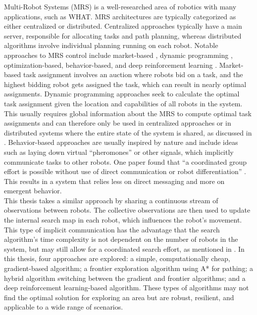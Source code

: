 Multi-Robot Systems (MRS) is a well-researched area of robotics with many applications, such as {\color{red} WHAT}. 
MRS architectures are typically categorized as either centralized or distributed. 
Centralized approaches typically have a main server, responsible for allocating tasks and path planning, whereas distributed algorithms involve individual planning running on each robot.
Notable approaches to MRS control include market-based \cite{trigui2014market}, dynamic programming \cite{kato2011dp}, optimization-based, behavior-based, and deep reinforcement learning \cite{huttenrauch2019deep-swarm}.
Market-based task assignment involves an auction where robots bid on a task, and the highest bidding robot gets assigned the task, which can result in nearly optimal assignments.
Dynamic programming approaches seek to calculate the optimal task assignment given the location and capabilities of all robots in the system.
This usually requires global information about the MRS to compute optimal task assignments and can therefore only be used in centralized approaches or in distributed systems where the entire state of the system is shared, as discussed in \cite{multi-robot-search-moving-target}.
Behavior-based approaches are usually inspired by nature and include ideas such as laying down virtual “pheromones” or other signals, which implicitly communicate tasks to other robots.
One paper found that “a coordinated group effort is possible without use of direct communication or robot differentiation” \cite{kube2000cooperative-ants}.
This results in a system that relies less on direct messaging and more on emergent behavior. \\

This thesis takes a similar approach by sharing a continuous stream of observations between robots.
The collective observations are then used to update the internal search map in each robot, which influences the robot's movement.
This type of implicit communication has the advantage that the search algorithm's time complexity is not dependent on the number of robots in the system, but may still allow for a coordinated search effort, as mentioned in \cite{multi-robot-search-moving-target}.
In this thesis, four approaches are explored: a simple, computationally cheap, gradient-based algorithm; a frontier exploration algorithm using A* for pathing; a hybrid algorithm switching between the gradient and frontier algorithms; and a deep reinforcement learning-based algorithm.
These types of algorithms may not find the optimal solution for exploring an area but are robust, resilient, and applicable to a wide range of scenarios.
